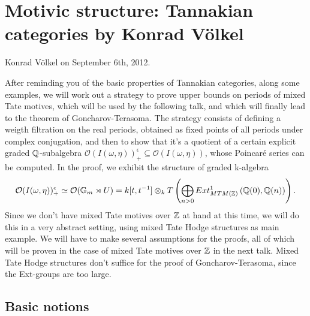 \chapter{Motivic structure: Tannakian categories by Konrad V\"olkel}

Konrad V\"olkel on September 6th, 2012.

\medskip
\medskip

\indent After reminding you of the basic properties of Tannakian categories, along some examples, we will work out a strategy to prove upper bounds on periods of mixed Tate motives, which will be used by the following talk, and which will finally lead to the theorem of Goncharov-Terasoma. The strategy consists of defining a weigth filtration on the real periods, obtained as fixed points of all periods under complex conjugation, and then to show that it's a quotient of a certain explicit graded $\mathbb{Q}$-subalgebra $\mathcal{O}(I(\omega,\eta))^\epsilon_+ \subseteq \mathcal{O}(I(\omega,\eta))$, whose Poincar\'e series can be computed. In the proof, we exhibit the structure of graded k-algebra
\[\mathcal{O}(I(\omega,\eta))^\epsilon_+ \simeq \mathcal{O}(\mathbb{G}_m \rtimes U) = k[t,t^{-1}] \otimes_k T\left(\bigoplus_{n>0}Ext^1_{MTM(\mathbb{Z})}\left(\mathbb{Q}(0),\mathbb{Q}(n)\right)\right).\]
Since we don't have mixed Tate motives over $\mathbb{Z}$ at hand at this time, we will do this in a very abstract setting, using mixed Tate Hodge structures as main example. We will have to make several assumptions for the proofs, all of which will be proven in the case of mixed Tate motives over $\mathbb{Z}$ in the next talk. Mixed Tate Hodge structures don't suffice for the proof of Goncharov-Terasoma, since the Ext-groups are too large.


\section{Basic notions}

